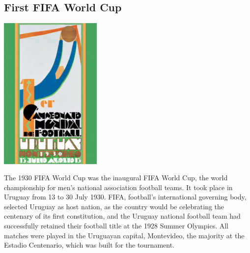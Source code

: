 \documentclass[11pt]{report}
\begin{document}
\subsection{First FIFA World Cup}
\vspace{2mm}\begin{center}\includegraphics[width=5cm]{./img/fifa1930.jpg}\end{center}
The 1930 FIFA World Cup was the inaugural FIFA World Cup, the world championship for men's national association football teams. It took place in Uruguay from 13 to 30 July 1930. FIFA, football's international governing body, selected Uruguay as host nation, as the country would be celebrating the centenary of its first constitution, and the Uruguay national football team had successfully retained their football title at the 1928 Summer Olympics. All matches were played in the Uruguayan capital, Montevideo, the majority at the Estadio Centenario, which was built for the tournament.
\section{}
\end{document}
